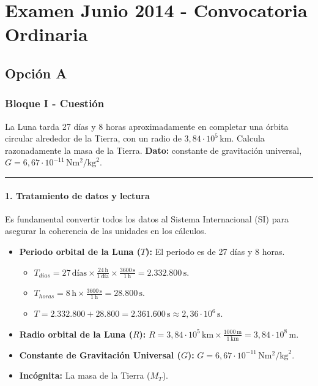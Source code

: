 \chapter{Examen Junio 2014 - Convocatoria Ordinaria}
\label{chap:2014_jun_ord}

\section{Opción A}
\label{sec:A_2014_jun_ord}

\subsection{Bloque I - Cuestión}
\label{subsec:A1_2014_jun_ord}

\begin{cajaenunciado}
La Luna tarda 27 días y 8 horas aproximadamente en completar una órbita circular alrededor de la Tierra, con un radio de $3,84\cdot10^{5}\,\text{km}$. Calcula razonadamente la masa de la Tierra.
\textbf{Dato:} constante de gravitación universal, $G=6,67\cdot10^{-11}\,\text{N}\text{m}^2/\text{kg}^2$.
\end{cajaenunciado}
\hrule

\subsubsection*{1. Tratamiento de datos y lectura}
Es fundamental convertir todos los datos al Sistema Internacional (SI) para asegurar la coherencia de las unidades en los cálculos.
\begin{itemize}
    \item \textbf{Periodo orbital de la Luna ($T$):} El periodo es de 27 días y 8 horas.
    \begin{itemize}
        \item $T_{dias} = 27 \, \text{días} \times \frac{24 \, \text{h}}{1 \, \text{día}} \times \frac{3600 \, \text{s}}{1 \, \text{h}} = 2.332.800 \, \text{s}$.
        \item $T_{horas} = 8 \, \text{h} \times \frac{3600 \, \text{s}}{1 \, \text{h}} = 28.800 \, \text{s}$.
        \item $T = 2.332.800 + 28.800 = 2.361.600 \, \text{s} \approx 2,36 \cdot 10^6 \, \text{s}$.
    \end{itemize}
    \item \textbf{Radio orbital de la Luna ($R$):} $R = 3,84 \cdot 10^5 \, \text{km} \times \frac{1000 \, \text{m}}{1 \, \text{km}} = 3,84 \cdot 10^8 \, \text{m}$.
    \item \textbf{Constante de Gravitación Universal ($G$):} $G = 6,67 \cdot 10^{-11} \, \text{N}\text{m}^2/\text{kg}^2$.
    \item \textbf{Incógnita:} La masa de la Tierra ($M_T$).
\end{itemize}

